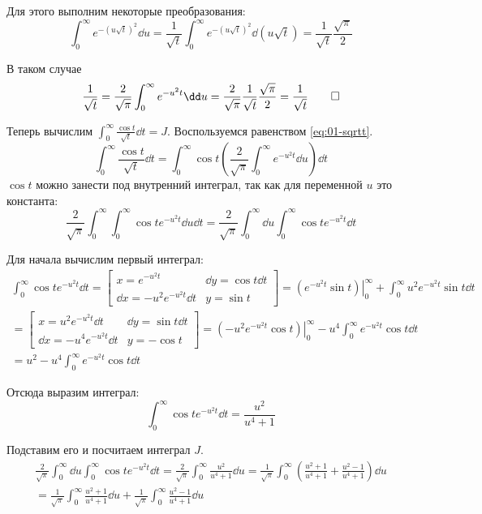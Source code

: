 Для этого выполним некоторые преобразования:
\[
  \int_{0}^{\infty} e^{-{\left(u \sqrt{t}\right)}^2} \dd u
  = \frac{1}{\sqrt{t}} \int_{0}^{\infty} e^{-{\left(u \sqrt{t}\right)}^2} \dd(u \sqrt{t})
  = \frac{1}{\sqrt{t}} \frac{\sqrt{\pi}}{2}
\]

В таком случае
\[
  \frac{1}{\sqrt{t}} = \frac{2}{\sqrt{\pi}} \int_{0}^{\infty} e^{-u^2 t} \dd u
  = \frac{2}{\sqrt{\pi}} \frac{1}{\sqrt{t}} \frac{\sqrt{\pi}}{2}
  = \frac{1}{\sqrt{t}} \qed
\]

Теперь вычислим \(\int_{0}^{\infty} \frac{\cos t}{\sqrt{t}} \dd t = J\).
Воспользуемся равенством \ref{eq:01-sqrtt}.
\[
  \int_{0}^{\infty} \frac{\cos t}{\sqrt{t}} \dd t
  = \int_{0}^{\infty} \cos t
  \left(\frac{2}{\sqrt{\pi}} \int_{0}^{\infty}  e^{-u^2 t} \dd u \right) \dd t
\]
\(\cos t\) можно занести под внутренний интеграл, так как для
переменной \(u\) это константа:
\[
  \frac{2}{\sqrt{\pi}} \int_{0}^{\infty} \int_{0}^{\infty} \cos t e^{-u^2 t} \dd u \dd t
  = \frac{2}{\sqrt{\pi}} \int_{0}^{\infty} \dd u \int_{0}^{\infty} \cos t e^{-u^2 t} \dd t
\]

Для начала вычислим первый интеграл:
\[
\begin{split}
  \int_{0}^{\infty} \cos t e^{-u^2 t} \dd t
  =
  \begin{bmatrix}
    x = e^{-u^2 t} & \dd y = \cos t \dd t \\
    \dd x = -u^2 e^{-u^2 t} \dd t & y = \sin t
  \end{bmatrix}
  = \left.\left(e^{-u^2 t} \sin t\right)\right\rvert_{0}^{\infty}
  + \int_{0}^{\infty} u^2 e^{-u^2 t} \sin t \dd t \\
  =
  \begin{bmatrix}
    x = u^2 e^{-u^2 t} \dd t & \dd y = \sin t \dd t \\
    \dd x = -u^4 e^{-u^2 t} \dd t & y = -\cos t
  \end{bmatrix}
  = \left.\left(-u^2 e^{-u^2 t} \cos t\right)\right\rvert_{0}^{\infty}
  - u^4 \int_{0}^{\infty} e^{-u^2 t} \cos t \dd t \\
  = u^2 - u^4 \int_{0}^{\infty} e^{-u^2 t} \cos t \dd t
\end{split}
\]

Отсюда выразим интеграл:
\[
  \int_{0}^{\infty} \cos t e^{-u^2 t} \dd t = \frac{u^2}{u^4 + 1}
\]

Подставим его и посчитаем интеграл \(J\).
\[
\begin{split}
  \frac{2}{\sqrt{\pi}} \int_{0}^{\infty} \dd u \int_{0}^{\infty} \cos t e^{-u^2 t} \dd t
  = \frac{2}{\sqrt{\pi}} \int_{0}^{\infty} \frac{u^2}{u^4 + 1} \dd u
  = \frac{1}{\sqrt{\pi}} \int_{0}^{\infty} \left(
    \frac{u^2 + 1}{u^4 + 1}
    + \frac{u^2 - 1}{u^4 + 1}
  \right) \dd u \\
  = \frac{1}{\sqrt{\pi}} \int_{0}^{\infty} \frac{u^2 + 1}{u^4 + 1} \dd u
  + \frac{1}{\sqrt{\pi}} \int_{0}^{\infty} \frac{u^2 - 1}{u^4 + 1} \dd u
\end{split}
\]

